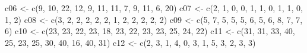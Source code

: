 \documentclass[
]{book}
\newenvironment{Shaded}{\begin{snugshade}}{\end{snugshade}}
\newcommand{\DecValTok}[1]{\textcolor[rgb]{0.00,0.00,0.81}{#1}}
\newcommand{\FunctionTok}[1]{\textcolor[rgb]{0.00,0.00,0.00}{#1}}
\newcommand{\NormalTok}[1]{#1}
\newcommand{\OtherTok}[1]{\textcolor[rgb]{0.56,0.35,0.01}{#1}}
\begin{document}
\begin{Shaded}
\begin{Highlighting}[]
\NormalTok{c06 }\OtherTok{\textless{}{-}} \FunctionTok{c}\NormalTok{(}\DecValTok{9}\NormalTok{, }\DecValTok{10}\NormalTok{, }\DecValTok{22}\NormalTok{, }\DecValTok{12}\NormalTok{, }\DecValTok{9}\NormalTok{, }\DecValTok{11}\NormalTok{, }\DecValTok{11}\NormalTok{, }\DecValTok{7}\NormalTok{, }\DecValTok{9}\NormalTok{, }\DecValTok{11}\NormalTok{, }\DecValTok{6}\NormalTok{, }\DecValTok{20}\NormalTok{)}
\NormalTok{c07 }\OtherTok{\textless{}{-}} \FunctionTok{c}\NormalTok{(}\DecValTok{2}\NormalTok{, }\DecValTok{1}\NormalTok{, }\DecValTok{0}\NormalTok{, }\DecValTok{0}\NormalTok{, }\DecValTok{1}\NormalTok{, }\DecValTok{1}\NormalTok{, }\DecValTok{0}\NormalTok{, }\DecValTok{1}\NormalTok{, }\DecValTok{1}\NormalTok{, }\DecValTok{0}\NormalTok{, }\DecValTok{1}\NormalTok{, }\DecValTok{2}\NormalTok{)}
\NormalTok{c08 }\OtherTok{\textless{}{-}} \FunctionTok{c}\NormalTok{(}\DecValTok{3}\NormalTok{, }\DecValTok{2}\NormalTok{, }\DecValTok{2}\NormalTok{, }\DecValTok{2}\NormalTok{, }\DecValTok{2}\NormalTok{, }\DecValTok{2}\NormalTok{, }\DecValTok{1}\NormalTok{, }\DecValTok{2}\NormalTok{, }\DecValTok{2}\NormalTok{, }\DecValTok{2}\NormalTok{, }\DecValTok{2}\NormalTok{, }\DecValTok{2}\NormalTok{)}
\NormalTok{c09 }\OtherTok{\textless{}{-}} \FunctionTok{c}\NormalTok{(}\DecValTok{5}\NormalTok{, }\DecValTok{7}\NormalTok{, }\DecValTok{5}\NormalTok{, }\DecValTok{5}\NormalTok{, }\DecValTok{5}\NormalTok{, }\DecValTok{6}\NormalTok{, }\DecValTok{5}\NormalTok{, }\DecValTok{6}\NormalTok{, }\DecValTok{8}\NormalTok{, }\DecValTok{7}\NormalTok{, }\DecValTok{7}\NormalTok{, }\DecValTok{6}\NormalTok{)}
\NormalTok{c10 }\OtherTok{\textless{}{-}} \FunctionTok{c}\NormalTok{(}\DecValTok{23}\NormalTok{, }\DecValTok{23}\NormalTok{, }\DecValTok{22}\NormalTok{, }\DecValTok{23}\NormalTok{, }\DecValTok{18}\NormalTok{, }\DecValTok{23}\NormalTok{, }\DecValTok{22}\NormalTok{, }\DecValTok{23}\NormalTok{, }\DecValTok{23}\NormalTok{, }\DecValTok{25}\NormalTok{, }\DecValTok{24}\NormalTok{, }\DecValTok{22}\NormalTok{)}
\NormalTok{c11 }\OtherTok{\textless{}{-}} \FunctionTok{c}\NormalTok{(}\DecValTok{31}\NormalTok{, }\DecValTok{31}\NormalTok{, }\DecValTok{33}\NormalTok{, }\DecValTok{40}\NormalTok{, }\DecValTok{25}\NormalTok{, }\DecValTok{23}\NormalTok{, }\DecValTok{25}\NormalTok{, }\DecValTok{30}\NormalTok{, }\DecValTok{40}\NormalTok{, }\DecValTok{16}\NormalTok{, }\DecValTok{40}\NormalTok{, }\DecValTok{31}\NormalTok{)}
\NormalTok{c12 }\OtherTok{\textless{}{-}} \FunctionTok{c}\NormalTok{(}\DecValTok{2}\NormalTok{, }\DecValTok{3}\NormalTok{, }\DecValTok{1}\NormalTok{, }\DecValTok{4}\NormalTok{, }\DecValTok{0}\NormalTok{, }\DecValTok{3}\NormalTok{, }\DecValTok{1}\NormalTok{, }\DecValTok{5}\NormalTok{, }\DecValTok{3}\NormalTok{, }\DecValTok{2}\NormalTok{, }\DecValTok{3}\NormalTok{, }\DecValTok{3}\NormalTok{)}

\end{Highlighting}
\end{Shaded}
\end{document}
